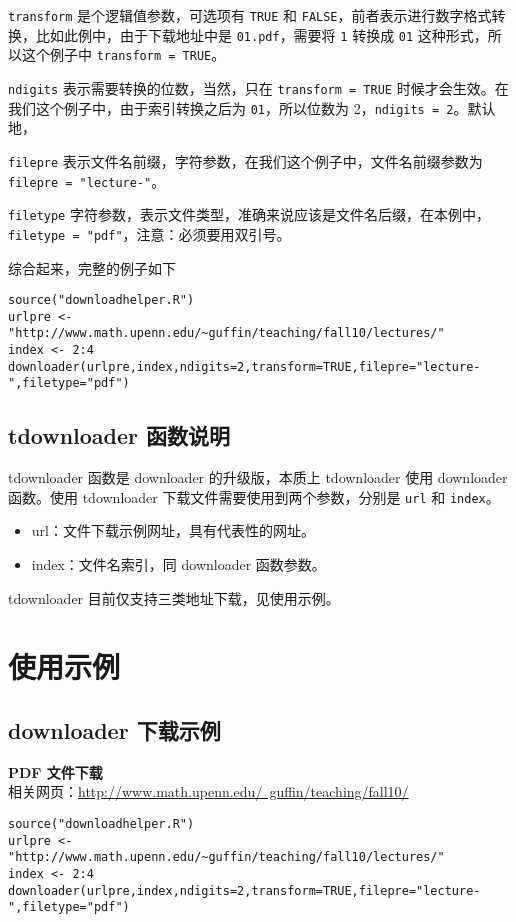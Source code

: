 \documentclass{article}
\begin{document}
\lstinline{transform} 是个逻辑值参数，可选项有 \lstinline{TRUE} 和 \lstinline{FALSE}，前者表示进行数字格式转换，比如此例中，由于下载地址中是 \lstinline{01.pdf}，需要将 \lstinline{1} 转换成 \lstinline{01} 这种形式，所以这个例子中 \lstinline{transform = TRUE}。

\lstinline{ndigits} 表示需要转换的位数，当然，只在 \lstinline{transform = TRUE} 时候才会生效。在我们这个例子中，由于索引转换之后为 \lstinline{01}，所以位数为 2，\lstinline{ndigits = 2}。默认地，

\lstinline{filepre} 表示文件名前缀，字符参数，在我们这个例子中，文件名前缀参数为 \lstinline{filepre = "lecture-"}。

\lstinline{filetype} 字符参数，表示文件类型，准确来说应该是文件名后缀，在本例中，\lstinline{filetype = "pdf"}，注意：必须要用双引号。

综合起来，完整的例子如下
\begin{lstlisting}
source("downloadhelper.R")
urlpre <- "http://www.math.upenn.edu/~guffin/teaching/fall10/lectures/"
index <- 2:4
downloader(urlpre,index,ndigits=2,transform=TRUE,filepre="lecture-",filetype="pdf")
\end{lstlisting}

\subsection{tdownloader 函数说明}
tdownloader 函数是 downloader 的升级版，本质上 tdownloader 使用 downloader 函数。使用 tdownloader 下载文件需要使用到两个参数，分别是 \lstinline{url} 和 \lstinline{index}。
\begin{itemize}
    \item url：文件下载示例网址，具有代表性的网址。
    \item index：文件名索引，同 downloader 函数参数。
\end{itemize}

tdownloader 目前仅支持三类地址下载，见使用示例。

\section{使用示例}
\subsection{downloader 下载示例}
\noindent\textbf{PDF 文件下载}\\
相关网页：\href{http://www.math.upenn.edu/~guffin/teaching/fall10/}{http://www.math.upenn.edu/~guffin/teaching/fall10/}
\begin{lstlisting}
source("downloadhelper.R")
urlpre <- "http://www.math.upenn.edu/~guffin/teaching/fall10/lectures/"
index <- 2:4
downloader(urlpre,index,ndigits=2,transform=TRUE,filepre="lecture-",filetype="pdf")
\end{lstlisting}
\end{document}
